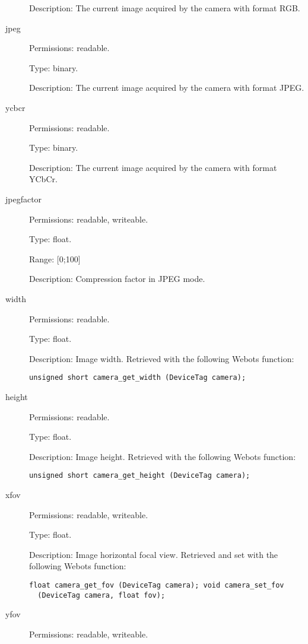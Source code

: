 \begin{description}
  Description: The current image acquired by the camera with format
  RGB.

\item[{jpeg}] Permissions: readable.


  Type: binary.


  Description: The current image acquired by the camera with format
  JPEG.

\item[{ycbcr}] Permissions: readable.


  Type: binary.


  Description: The current image acquired by the camera with format
  YCbCr.

\item[{jpegfactor}] Permissions: readable, writeable.


  Type: float.


  Range: [0;100]


  Description: Compression factor in JPEG mode.
\item[{width}] Permissions: readable.


  Type: float.


  Description: Image width. Retrieved with the following Webots
  function:


\begin{lstlisting}[firstnumber=1,]
  unsigned short camera_get_width (DeviceTag camera);
\end{lstlisting}
\item[{height}] Permissions: readable.


  Type: float.


  Description: Image height. Retrieved with the following Webots
  function:


\begin{lstlisting}[firstnumber=1,]
  unsigned short camera_get_height (DeviceTag camera);
\end{lstlisting}
\item[{xfov}] Permissions: readable, writeable.


  Type: float.


  Description: Image horizontal focal view.  Retrieved and set with
  the following Webots function:


\begin{lstlisting}[firstnumber=1,]
  float camera_get_fov (DeviceTag camera); void camera_set_fov
  (DeviceTag camera, float fov);
\end{lstlisting}
\item[{yfov}] Permissions: readable, writeable.



\end{description}

